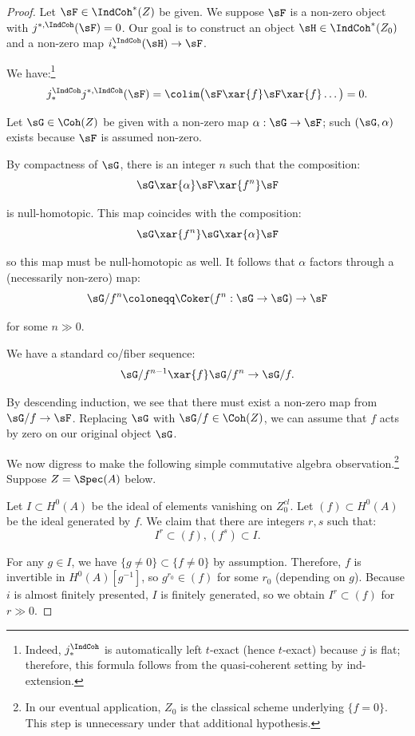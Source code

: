 \begin{proof}

Let $\sF \in \IndCoh^*(Z)$ be given. We suppose $\sF$ is a non-zero
object with $j^{*,\IndCoh}(\sF) = 0$. Our goal is to construct
an object $\sH \in \IndCoh^*(Z_0)$ and a non-zero map
$i_*^{\IndCoh}(\sH) \to \sF$.

\step We have:\footnote{Indeed, $j_*^{\IndCoh}$ is automatically left $t$-exact
(hence $t$-exact) because $j$ is flat; therefore, this formula follows from
the quasi-coherent setting by ind-extension.}
%
\[
j_*^{\IndCoh}j^{*,\IndCoh}(\sF) = \colim \big(\sF \xar{f} \sF \xar{f} \ldots \big) =
0.
\]

Let $\sG \in \Coh(Z)$ be given with a non-zero map $\alpha:\sG \to \sF$; such
$(\sG,\alpha)$
exists because $\sF$ is assumed non-zero.

By compactness of $\sG$, there is an integer $n$ such that the composition:
%
\[
\sG \xar{\alpha} \sF \xar{f^n} \sF
\]

 is null-homotopic. This map coincides with the composition:
%
\[
\sG \xar{f^n} \sG \xar{\alpha} \sF
\]

 so this map must be null-homotopic as well.
It follows that $\alpha$ factors through a (necessarily non-zero) map:
%
\[
\sG/f^n\coloneqq \Coker(f^n:\sG \to \sG) \to \sF
\]

 for some $n \gg 0$.

We have a standard co/fiber sequence:
%
\[
\sG/{f^{n-1}} \xar{f} \sG/f^n \to \sG/f.
\]

 By descending induction, we see that there must exist
a non-zero map from $\sG/f \to \sF$. Replacing $\sG$ with $\sG/f \in \Coh(Z)$,
we can assume that $f$ acts by zero on our original object $\sG$.

\step We now digress to make the following simple commutative algebra
observation.\footnote{In our eventual application, $Z_0$ is the classical
scheme underlying $\{f=0\}$. This step is unnecessary under that
additional hypothesis.}
Suppose $Z = \Spec(A)$ below.

Let $I \subset H^0(A)$ be the ideal of
elements vanishing on $Z_0^{cl}$. Let $(f) \subset H^0(A)$
be the ideal generated by $f$. We claim that there are integers $r,s$
such that:
%
\[
I^r \subset (f), (f^s) \subset I.
\]

For any $g \in I$, we have $\{g \neq 0\} \subset \{f \neq 0\}$ by assumption.
Therefore, $f$ is invertible in $H^0(A)[g^{-1}]$, so $g^{r_0} \in (f)$ for some
$r_0$ (depending on $g$).
Because $i$ is almost finitely presented, $I$ is finitely generated,
so we obtain $I^r \subset (f)$ for $r \gg 0$.


\end{proof}
